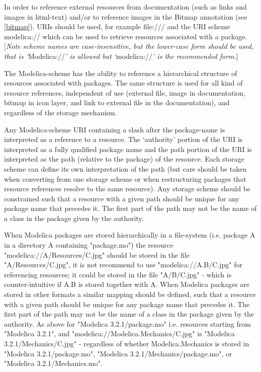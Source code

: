 \documentclass[10pt,a4paper]{report}
\begin{document}
In order to reference external resources from documentation (such as
links and images in html-text) and/or to reference images in the Bitmap
annotation (see \ref{bitmap}). URIs should be used, for example
file:/// and the URI scheme modelica:// which can be used to retrieve
resources associated with a package. {[}\emph{Note scheme names are
case-insensitive, but the lower-case form should be used, that is
`}Modelica://\emph{' is allowed but `}modelica://\emph{' is the
recommended form.}{]}

The Modelica-scheme has the ability to reference a hierarchical
structure of resources associated with packages. The same structure is
used for all kind of resource references, independent of use (external
file, image in documentation, bitmap in icon layer, and link to external
file in the documentation), and regardless of the storage mechanism.

Any Modelica-scheme URI containing a slash after the package-name is
interpreted as a reference to a resource. The `authority' portion of the
URI is interpreted as a fully qualified package name and the path
portion of the URI is interpreted as the path (relative to the package)
of the resource. Each storage scheme can define its own interpretation
of the path (but care should be taken when converting from one storage
scheme or when restructuring packages that resource references resolve
to the same resource). Any storage scheme should be constrained such
that a resource with a given path should be unique for any package name
that precedes it. The first part of the path may not be the name of a
class in the package given by the authority.

When Modelica packages are stored hierarchically in a file-system (i.e.
package A in a directory A containing "package.mo") the resource
"modelica://A/Resources/C.jpg" should be stored in the file
"A/Resources/C.jpg", it is not recommend to use "modelica://A.B/C.jpg"
for referencing resources; it could be stored in the file "A/B/C.jpg" -
which is counter-intuitive if A.B is stored together with A. When
Modelica packages are stored in other formats a similar mapping should
be defined, such that a resource with a given path should be unique for
any package name that precedes it. The first part of the path may not be
the name of a class in the package given by the authority. As above for
"Modelica 3.2.1/package.mo" i.e. resources starting from "Modelica
3.2.1", and "modelica://Modelica.Mechanics/C.jpg" is "Modelica
3.2.1/Mechanics/C.jpg" - regardless of whether Modelica.Mechanics is
stored in "Modelica 3.2.1/package.mo", "Modelica
3.2.1/Mechanics/package.mo", or "Modelica 3.2.1/Mechanics.mo".
\end{document}
